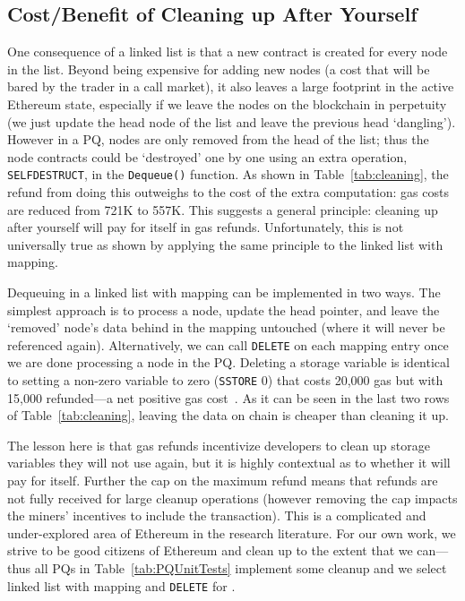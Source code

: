 
\subsection{Cost/Benefit of Cleaning up After Yourself}
\label{sec:gasrefund}



One consequence of a linked list is that a new contract is created for every node in the list. Beyond being expensive for adding new nodes (a cost that will be bared by the trader in a call market), it also leaves a large footprint in the active Ethereum state, especially if we leave the nodes on the blockchain in perpetuity (\ie we just update the head node of the list and leave the previous head `dangling'). However in a PQ, nodes are only removed from the head of the list; thus the node contracts could be `destroyed' one by one using an extra operation, \texttt{SELFDESTRUCT}, in the \texttt{Dequeue()} function. As shown in Table~\ref{tab:cleaning}, the refund from doing this outweighs to the cost of the extra computation: gas costs are reduced from 721K to 557K.  This suggests a general principle: cleaning up after yourself will pay for itself in gas refunds. Unfortunately, this is not universally true as shown by applying the same principle to the linked list with mapping. 

Dequeuing in a linked list with mapping can be implemented in two ways. The simplest approach is to process a node, update the head pointer, and leave the `removed' node's data behind in the mapping untouched (where it will never be referenced again). Alternatively, we can call \texttt{DELETE} on each mapping entry once we are done processing a node in the PQ. Deleting a storage variable is identical to setting a non-zero variable to zero (\texttt{SSTORE} 0) that costs 20,000 gas but with 15,000 refunded---a net positive gas cost~\cite{wood2014ethereum}. As it can be seen in the last two rows of Table~\ref{tab:cleaning}, leaving the data on chain is cheaper than cleaning it up.

The lesson here is that gas refunds incentivize developers to clean up storage variables they will not use again, but it is highly contextual as to whether it will pay for itself. Further the cap on the maximum refund means that refunds are not fully received for large cleanup operations (however removing the cap impacts the miners' incentives to include the transaction). This is a complicated and under-explored area of Ethereum in the research literature. For our own work, we strive to be good citizens of Ethereum and clean up to the extent that we can---thus all PQs in Table~\ref{tab:PQUnitTests} implement some cleanup and we select linked list with mapping and \texttt{DELETE} for \cm.



